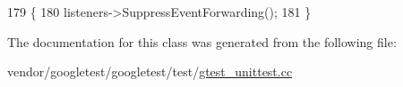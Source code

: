 \begin{DoxyCode}
179                                                                      \{
180     listeners->SuppressEventForwarding();
181   \}
\end{DoxyCode}


The documentation for this class was generated from the following file\+:\begin{DoxyCompactItemize}
\item 
vendor/googletest/googletest/test/\hyperlink{gtest__unittest_8cc}{gtest\+\_\+unittest.\+cc}\end{DoxyCompactItemize}
